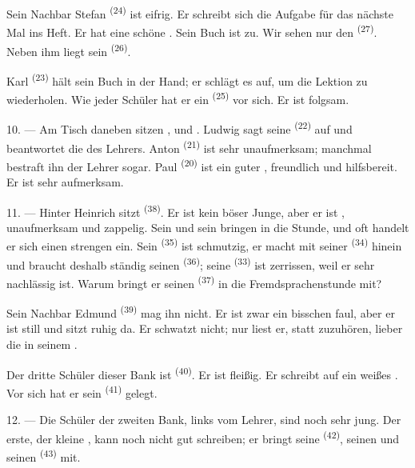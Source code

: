 Sein Nachbar Stefan \textsuperscript{(24)} ist eifrig. Er schreibt sich die Aufgabe
für das nächste Mal ins Heft. Er hat eine schöne . Sein Buch
ist zu. Wir sehen nur den  \textsuperscript{(27)}. Neben ihm liegt
sein  \textsuperscript{(26)}.

Karl \textsuperscript{(23)} hält sein Buch in der Hand; er schlägt es auf, um die
Lektion zu wiederholen. Wie jeder Schüler hat er ein 
\textsuperscript{(25)} vor sich. Er ist folgsam.

10. --- Am Tisch daneben sitzen ,  und
. Ludwig sagt seine  \textsuperscript{(22)} auf und
beantwortet die  des Lehrers. Anton \textsuperscript{(21)} ist sehr
unaufmerksam; manchmal bestraft ihn der Lehrer sogar. Paul \textsuperscript{(20)} ist
ein guter , freundlich und hilfsbereit. Er ist sehr aufmerksam.

\VUsaut{4.2mm}
\VUsaut{3.2mm}

11. --- Hinter Heinrich sitzt  \textsuperscript{(38)}. Er ist kein böser
Junge, aber er ist , unaufmerksam und zappelig. Sein
 und sein  bringen  in die
Stunde, und oft handelt er sich einen strengen  ein. Sein
 \textsuperscript{(35)} ist schmutzig, er macht mit seiner
 \textsuperscript{(34)}  hinein und braucht
deshalb ständig seinen  \textsuperscript{(36)}; seine
 \textsuperscript{(33)} ist zerrissen, weil er sehr nachlässig ist.
Warum bringt er seinen  \textsuperscript{(37)} in die
Fremdsprachenstunde mit?

Sein Nachbar Edmund \textsuperscript{(39)} mag ihn nicht. Er ist zwar ein bisschen
faul, aber er ist still und sitzt ruhig da. Er schwatzt nicht; nur liest er,
statt zuzuhören, lieber die  in seinem .

Der dritte Schüler dieser Bank ist  \textsuperscript{(40)}. Er ist
fleißig. Er schreibt auf ein weißes . Vor sich hat er sein
 \textsuperscript{(41)} gelegt.

12. --- Die Schüler der zweiten Bank, links vom Lehrer, sind noch sehr jung. Der
erste, der kleine , kann noch nicht gut schreiben; er bringt seine
 \textsuperscript{(42)}, seinen  und seinen
 \textsuperscript{(43)} mit.

